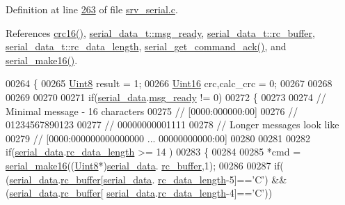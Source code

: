 Definition at line \hyperlink{a00030_source_l00263}{263} of file \hyperlink{a00030_source}{srv\+\_\+serial.\+c}.



References \hyperlink{a00060_source_l00084}{crc16()}, \hyperlink{a00030_source_l00035}{serial\+\_\+data\+\_\+t\+::msg\+\_\+ready}, \hyperlink{a00030_source_l00031}{serial\+\_\+data\+\_\+t\+::rc\+\_\+buffer}, \hyperlink{a00030_source_l00033}{serial\+\_\+data\+\_\+t\+::rc\+\_\+data\+\_\+length}, \hyperlink{a00030_source_l00343}{serial\+\_\+get\+\_\+command\+\_\+ack()}, and \hyperlink{a00030_source_l00381}{serial\+\_\+make16()}.


\begin{DoxyCode}
00264 \{
00265     \hyperlink{a00072_af84840501dec18061d18a68c162a8fa2}{Uint8} result = 1;
00266     \hyperlink{a00072_a59a9f6be4562c327cbfb4f7e8e18f08b}{Uint16} crc,calc\_crc = 0;
00267    
00268 
00269     
00270 
00271     \textcolor{keywordflow}{if}(\hyperlink{a00030_a77d3b77ccd59a0065642bf1ac7887b9d}{serial\_data}.\hyperlink{a00030_ac0789a6c9ab7ccd13d6f04ae31496854}{msg\_ready} != 0)
00272     \{
00273 
00274         \textcolor{comment}{// Minimal message - 16 characters}
00275         \textcolor{comment}{// [0000:000000:00]}
00276         \textcolor{comment}{// 01234567890123}
00277         \textcolor{comment}{// 00000000001111}
00278         \textcolor{comment}{// Longer messages look like}
00279         \textcolor{comment}{// [0000:000000000000000  ... 00000000000:00]}
00280 
00281 
00282         \textcolor{keywordflow}{if}(\hyperlink{a00030_a77d3b77ccd59a0065642bf1ac7887b9d}{serial\_data}.\hyperlink{a00030_ab136d4fef2c523afd55b6ca74c46d7cc}{rc\_data\_length} >= 14 )
00283         \{
00284 
00285             *cmd = \hyperlink{a00030_abc17de32f14103a5be219df0d4ad9176}{serial\_make16}((\hyperlink{a00072_af84840501dec18061d18a68c162a8fa2}{Uint8}*)\hyperlink{a00030_a77d3b77ccd59a0065642bf1ac7887b9d}{serial\_data}.
      \hyperlink{a00030_ac734cb8be27f86bd99edc539434883a4}{rc\_buffer},1);
00286 
00287             \textcolor{keywordflow}{if}( (\hyperlink{a00030_a77d3b77ccd59a0065642bf1ac7887b9d}{serial\_data}.\hyperlink{a00030_ac734cb8be27f86bd99edc539434883a4}{rc\_buffer}[\hyperlink{a00030_a77d3b77ccd59a0065642bf1ac7887b9d}{serial\_data}.
      \hyperlink{a00030_ab136d4fef2c523afd55b6ca74c46d7cc}{rc\_data\_length}-5]==\textcolor{charliteral}{'C'}) && (\hyperlink{a00030_a77d3b77ccd59a0065642bf1ac7887b9d}{serial\_data}.\hyperlink{a00030_ac734cb8be27f86bd99edc539434883a4}{rc\_buffer}[
      \hyperlink{a00030_a77d3b77ccd59a0065642bf1ac7887b9d}{serial\_data}.\hyperlink{a00030_ab136d4fef2c523afd55b6ca74c46d7cc}{rc\_data\_length}-4]==\textcolor{charliteral}{'C'}))

\end{DoxyCode}
